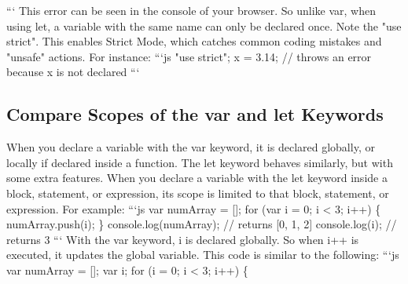 \documentclass{article}%
\begin{document}
```\newline%
This error can be seen in the console of your browser.\newline%
So unlike var, when using let, a variable with the same name can only be declared once.\newline%
Note the "use strict". This enables Strict Mode, which catches common coding mistakes and "unsafe" actions. For instance:\newline%
```js\newline%
"use strict";\newline%
x = 3.14; // throws an error because x is not declared\newline%
```\newline%

%
\subsection{Compare Scopes of the var and let Keywords}%
\label{subsec:CompareScopesofthevarandletKeywords}%
When you declare a variable with the var keyword, it is declared globally, or locally if declared inside a function.\newline%
The let keyword behaves similarly, but with some extra features. When you declare a variable with the let keyword inside a block, statement, or expression, its scope is limited to that block, statement, or expression.\newline%
For example:\newline%
```js\newline%
var numArray = {[}{]};\newline%
for (var i = 0; i < 3; i++) \{\newline%
  numArray.push(i);\newline%
\}\newline%
console.log(numArray);\newline%
// returns {[}0, 1, 2{]}\newline%
console.log(i);\newline%
// returns 3\newline%
```\newline%
With the var keyword, i is declared globally. So when i++ is executed, it updates the global variable. This code is similar to the following:\newline%
```js\newline%
var numArray = {[}{]};\newline%
var i;\newline%
for (i = 0; i < 3; i++) \{\newline%
\end{document}
